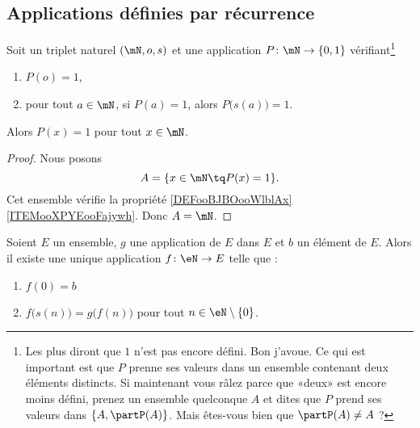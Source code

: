 \subsection{Applications définies par récurrence}

\begin{proposition}      \label{PROPooXTRCooKwrWkq}
	Soit un triplet naturel \( (\mN,o,s)\) et une application \( P\colon \mN\to \{ 0,1 \}\) vérifiant\footnote{Les plus  diront que \( 1\) n'est pas encore défini. Bon j'avoue. Ce qui est important est que \( P\) prenne ses valeurs dans un ensemble contenant deux éléments distincts. Si maintenant vous râlez parce que «deux» est encore moins défini, prenez un ensemble quelconque \( A\) et dites que \( P\) prend ses valeurs dans \( \{ A, \partP(A)\}\). Mais êtes-vous bien  que \( \partP(A)\neq A\) ?}
	\begin{enumerate}
		\item
		      \( P(o)=1\),
		\item
		      pour tout \( a\in \mN\), si \( P(a)=1\), alors \( P\big( s(a) \big)=1\).
	\end{enumerate}
	Alors \( P(x)=1\) pour tout \( x\in \mN\).
\end{proposition}

\begin{proof}
	Nous posons
	\begin{equation}
		A=\{ x\in\mN\tq P(x)=1 \}.
	\end{equation}
	Cet ensemble vérifie la propriété \ref{DEFooBJBOooWlblAx}\ref{ITEMooXPYEooFajywh}. Donc \( A=\mN\).
\end{proof}

\begin{theorem}       \label{THOooEJPYooZFVnez}
	Soient \( E\) un ensemble, \( g\) une application de \( E\) dans \( E\) et \( b\) un élément de \( E\).  Alors il existe une unique application \( f\colon \eN\to E\) telle que :
	\begin{enumerate}
		\item
		      \( f(0)=b\)
		\item
		      \( f\big( s(n) \big)=g\big( f(n) \big)\) pour tout \( n\in \eN\setminus\{ 0 \}\).
	\end{enumerate}
\end{theorem}

